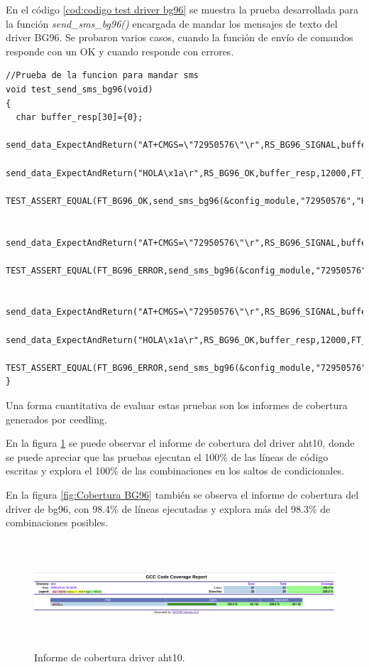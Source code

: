 En el código \ref{cod:codigo test driver bg96} se muestra la prueba desarrollada para la función \emph{send\_sms\_bg96()} encargada de mandar los mensajes de texto del driver BG96. Se probaron varios casos, cuando la función de envío de comandos responde con un OK y cuando responde con errores.
\begin{lstlisting}[label=cod:codigo test driver bg96,caption=Tests del driver del modulo bg96.] 
//Prueba de la funcion para mandar sms  
void test_send_sms_bg96(void)
{
  char buffer_resp[30]={0};
  send_data_ExpectAndReturn("AT+CMGS=\"72950576\"\r",RS_BG96_SIGNAL,buffer_resp,12000,FT_BG96_OK);
  send_data_ExpectAndReturn("HOLA\x1a\r",RS_BG96_OK,buffer_resp,12000,FT_BG96_OK);
  TEST_ASSERT_EQUAL(FT_BG96_OK,send_sms_bg96(&config_module,"72950576","HOLA"));

  send_data_ExpectAndReturn("AT+CMGS=\"72950576\"\r",RS_BG96_SIGNAL,buffer_resp,12000,FT_BG96_ERROR);
  TEST_ASSERT_EQUAL(FT_BG96_ERROR,send_sms_bg96(&config_module,"72950576","HOLA"));

  send_data_ExpectAndReturn("AT+CMGS=\"72950576\"\r",RS_BG96_SIGNAL,buffer_resp,12000,FT_BG96_OK);
  send_data_ExpectAndReturn("HOLA\x1a\r",RS_BG96_OK,buffer_resp,12000,FT_BG96_ERROR);
  TEST_ASSERT_EQUAL(FT_BG96_ERROR,send_sms_bg96(&config_module,"72950576","HOLA"));
}
\end{lstlisting}

Una forma cuantitativa de evaluar estas pruebas son los informes de cobertura generados por ceedling.

En la figura \ref{fig:Cobertura aht10} se puede observar el informe de cobertura del driver aht10, donde se puede apreciar que las pruebas ejecutan el 100\% de las líneas de código escritas y explora el 100\% de las combinaciones en los saltos de condicionales.

En la figura \ref{fig:Cobertura BG96} también se observa el informe de cobertura del driver de bg96, con 98.4\% de líneas ejecutadas y explora más del 98.3\% de combinaciones posibles. 

\begin{figure}[h!]
    \centering
      \includegraphics[width=\linewidth, height=4cm]{./Figures/cobertura_aht10.png}
    \caption{Informe de cobertura driver aht10.}
      \label{fig:Cobertura aht10}
  \end{figure}

